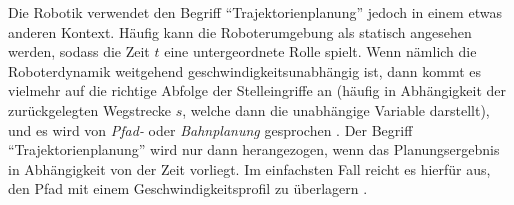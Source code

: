 Die Robotik verwendet den Begriff "`Trajektorienplanung"' jedoch in einem etwas anderen Kontext. Häufig kann die Roboterumgebung als statisch angesehen werden, sodass die Zeit $t$ eine untergeordnete Rolle spielt. Wenn nämlich die Roboterdynamik weitgehend geschwindigkeitsunabhängig ist, dann kommt es vielmehr auf die richtige Abfolge der Stelleingriffe an (häufig in Abhängigkeit der zurückgelegten Wegstrecke $s$, welche dann die unabhängige Variable darstellt), und es wird von \emph{Pfad-} oder \emph{Bahnplanung} gesprochen \cite{latombe1990robot, lavalle2006pa}. Der Begriff "`Trajektorienplanung"' wird nur dann herangezogen, wenn das Planungsergebnis in Abhängigkeit von der Zeit vorliegt. Im einfachsten Fall reicht es hierfür aus, den Pfad mit einem Geschwindigkeitsprofil zu überlagern \cite{lavalle2006pa}.





